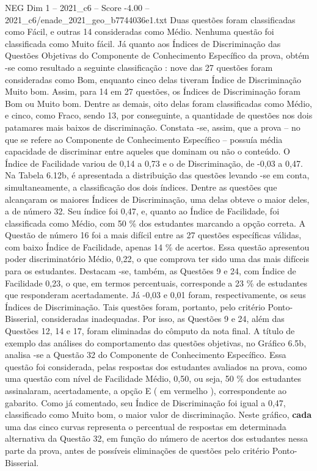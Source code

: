 \begin{textsample}{NEG Dim 1 – 2021\_c6 – Score -4.00 – 2021\_c6/enade\_2021\_geo\_b7744036e1.txt}
Duas questões foram classificadas como Fácil, e outras 14 consideradas como Médio.
Nenhuma questão foi classificada como Muito fácil.
Já quanto aos Índices de Discriminação das Questões Objetivas do Componente de Conhecimento Específico da prova, obtém -se como resultado a seguinte classificação : nove das 27 questões foram consideradas como Bom, enquanto cinco delas tiveram Índice de Discriminação Muito bom.
Assim, para 14 em 27 questões, os Índices de Discriminação foram Bom ou Muito bom.
Dentre as demais, oito delas foram classificadas como Médio, e cinco, como Fraco, sendo 13, por conseguinte, a quantidade de questões nos dois patamares mais baixos de discriminação.
Constata -se, assim, que a prova – no que se refere ao Componente de Conhecimento Específico – possuía média capacidade de discriminar entre aqueles que dominam ou não o conteúdo.
O Índice de Facilidade variou de 0,14 a 0,73 e o de Discriminação, de -0,03 a 0,47.
Na Tabela 6.12b, é apresentada a distribuição das questões levando -se em conta, simultaneamente, a classificação dos dois índices.
Dentre as questões que alcançaram os maiores Índices de Discriminação, uma delas obteve o maior deles, a de número 32.
Seu índice foi 0,47, e, quanto ao Índice de Facilidade, foi classificada como Médio, com 50 \% dos estudantes marcando a opção correta.
A Questão de número 16 foi a mais difícil entre as 27 questões específicas válidas, com baixo Índice de Facilidade, apenas 14 \% de acertos.
Essa questão apresentou poder discriminatório Médio, 0,22, o que comprova ter sido uma das mais difíceis para os estudantes.
Destacam -se, também, as Questões 9 e 24, com Índice de Facilidade 0,23, o que, em termos percentuais, corresponde a 23 \% de estudantes que responderam acertadamente.
Já -0,03 e 0,01 foram, respectivamente, os seus Índices de Discriminação.
Tais questões foram, portanto, pelo critério Ponto-Bisserial, consideradas inadequadas.
Por isso, as Questões 9 e 24, além das Questões 12, 14 e 17, foram eliminadas do cômputo da nota final.
A título de exemplo das análises do comportamento das questões objetivas, no Gráfico 6.5b, analisa -se a Questão 32 do Componente de Conhecimento Específico.
Essa questão foi considerada, pelas respostas dos estudantes avaliados na prova, como uma questão com nível de Facilidade Médio, 0,50, ou seja, 50 \% dos estudantes assinalaram, acertadamente, a opção E ( em vermelho ), correspondente ao gabarito.
Como já comentado, seu Índice de Discriminação foi igual a 0,47, classificado como Muito bom, o maior valor de discriminação.
Neste gráfico, \textbf{cada} uma das cinco curvas representa o percentual de respostas em determinada alternativa da Questão 32, em função do número de acertos dos estudantes nessa parte da prova, antes de possíveis eliminações de questões pelo critério Ponto-Bisserial.

\end{textsample}
